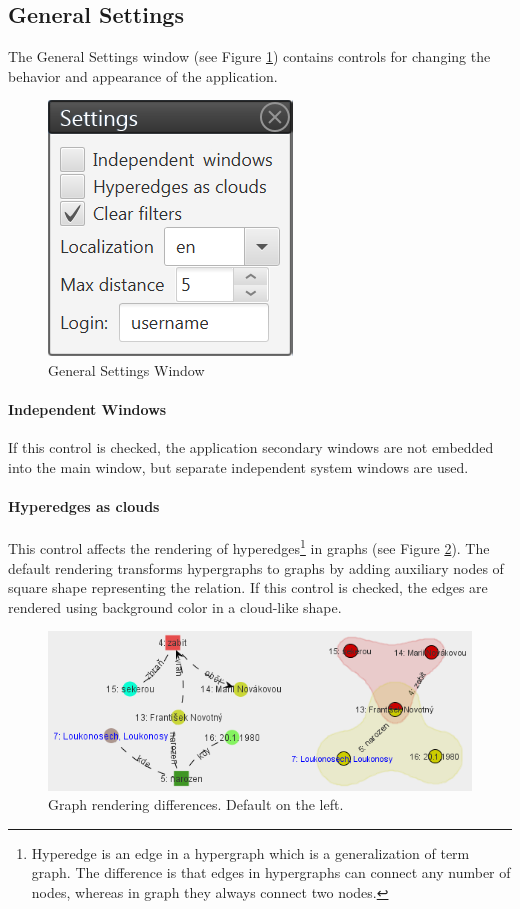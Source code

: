 \subsection{General Settings}
\label{sssec:GeneralSettings}

The General Settings window (see Figure \ref{fig:GeneralSettings}) contains
controls for changing the behavior and appearance of the application.

\begin{figure}[!htb]
        \centering
        \includegraphics{Images/general}
        \caption{General Settings Window}
        \label{fig:GeneralSettings}
\end{figure}

\paragraph{Independent Windows} If this control is checked, the application
secondary windows are not embedded into the main window, but separate
independent system windows are used.

\paragraph{Hyperedges as clouds} This control affects the rendering of
hyperedges\footnote{Hyperedge is an edge in a hypergraph which is a
generalization of term graph. The difference is that edges in hypergraphs can
connect any number of nodes, whereas in graph they always connect two nodes.}
in graphs (see Figure \ref{fig:Hypergraphs}). The default rendering transforms
hypergraphs to graphs by adding auxiliary nodes of square shape representing
the relation. If this control is checked, the edges are rendered using
background color in a cloud-like shape.

\begin{figure}[!htb]
        \centering
        \includegraphics[width=\textwidth]{Images/hypergraphs}
        \caption{Graph rendering differences. Default on the left.}
        \label{fig:Hypergraphs}
\end{figure}

